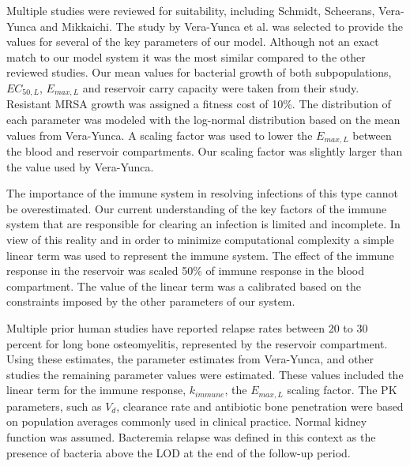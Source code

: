 \documentclass[12pt, draftcls, onecolumn]{IEEEtran}
\begin{document}
Multiple studies were reviewed for suitability, including Schmidt, Scheerans, Vera-Yunca  and Mikkaichi. The study by Vera-Yunca et al. was selected to provide the values for several of the key parameters of our model. Although not an exact match to our model system it was the most similar compared to the other reviewed studies.  Our mean values for bacterial growth of both subpopulations, $EC_{50,L}$, $E_{max,L}$ and reservoir carry capacity were taken from their study. Resistant MRSA growth was assigned a fitness cost of 10\%. The distribution of each parameter was modeled with the log-normal distribution based on the mean values from Vera-Yunca.  A scaling factor was used to lower the $E_{max,L}$ between the blood and reservoir compartments. Our scaling factor was slightly larger than the value used by Vera-Yunca.   

The importance of the immune system in resolving infections of this type cannot be overestimated.  Our current understanding of the key factors of the immune system that are responsible for clearing an infection is limited and incomplete.  In view of this reality and in order to minimize computational complexity a simple linear term was used to represent the immune system. The effect of the immune response in the reservoir was scaled 50\% of immune response in the blood compartment.  The value of the linear term was a calibrated based on the constraints imposed by the other parameters of our system. 

Multiple prior human studies have reported relapse rates between 20 to 30 percent for long bone osteomyelitis, represented by the reservoir compartment.  Using these estimates, the parameter estimates from Vera-Yunca, and other studies the remaining parameter values were estimated.  These values included the linear term for the immune response, $k_{immune}$, the $E_{max,L}$ scaling factor.  The PK parameters, such as $V_{d}$, clearance rate and antibiotic bone penetration were based on population averages commonly used in clinical practice.  Normal kidney function was assumed.  Bacteremia relapse was defined in this context as the presence of bacteria above the LOD at the end of the follow-up period.
\end{document}
